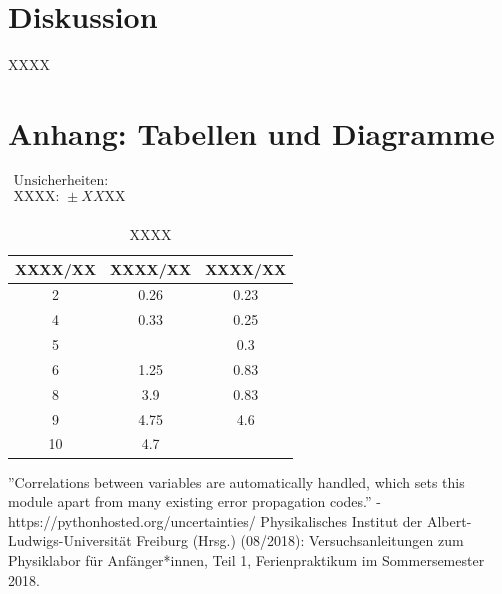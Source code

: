 \documentclass[11pt,a4paper]{article}
\begin{document}
\section{Diskussion}

XXXX

\pagebreak

\section{Anhang: Tabellen und Diagramme}

\begin{table}[h]
\centering
\caption{XXXX} \vspace{11pt}
$\begin{array}{l}
\textrm{Unsicherheiten:}\\
\textrm{XXXX: } \pm XX \textrm{XX}\\
\end{array}$
\begin{tabular}{ccc}
\toprule
\textrm{XXXX}/\textrm{XX} & \textrm{XXXX}/\textrm{XX} & \textrm{XXXX}/\textrm{XX} \\
\midrule 
2 & 0.26 & 0.23\\
\hline
4 & 0.33 & 0.25\\
\hline 
5 & & 0.3\\
\hline 
6 & 1.25 & 0.83\\
\hline 
8 & 3.9 & 0.83\\ 
\hline
9 & 4.75 & 4.6\\ 
\hline
10 & 4.7 &\\ 
\bottomrule
\end{tabular}
\label{Tab:X}
\end{table}


\begin{thebibliography}{9}
''Correlations between variables are automatically handled, which sets this module apart from many existing error propagation codes.'' - https://pythonhosted.org/uncertainties/
 Physikalisches Institut der Albert-Ludwigs-Universität Freiburg (Hrsg.) (08/2018): Versuchsanleitungen zum Physiklabor für Anfänger*innen, Teil 1, Ferienpraktikum im Sommersemester 2018.
\end{thebibliography}
\end{document}
